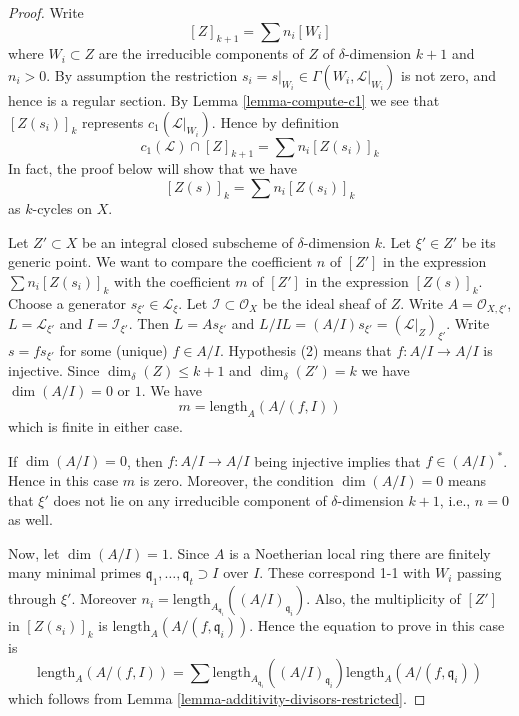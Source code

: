 \begin{proof}
Write
$$
[Z]_{k + 1} = \sum n_i[W_i]
$$
where $W_i \subset Z$ are the irreducible components of
$Z$ of $\delta$-dimension $k + 1$ and $n_i > 0$.
By assumption the restriction
$s_i = s|_{W_i} \in \Gamma(W_i, \mathcal{L}|_{W_i})$ is not
zero, and hence is a regular section. By Lemma \ref{lemma-compute-c1}
we see that $[Z(s_i)]_k$ represents $c_1(\mathcal{L}|_{W_i})$.
Hence by definition
$$
c_1(\mathcal{L}) \cap [Z]_{k + 1} = \sum n_i[Z(s_i)]_k
$$
In fact, the proof below will show that we have
\begin{equation}
\label{equation-equal-as-cycles}
[Z(s)]_k =  \sum n_i[Z(s_i)]_k
\end{equation}
as $k$-cycles on $X$.

\medskip\noindent
Let $Z' \subset X$ be an integral closed subscheme of
$\delta$-dimension $k$. Let $\xi' \in Z'$ be its generic point.
We want to compare the coefficient $n$ of $[Z']$ in the expression
$\sum n_i[Z(s_i)]_k$ with the coefficient $m$ of $[Z']$ in the
expression $[Z(s)]_k$. Choose a generator $s_{\xi'} \in \mathcal{L}_\xi$.
Let $\mathcal{I} \subset \mathcal{O}_X$ be the ideal sheaf of $Z$.
Write $A = \mathcal{O}_{X, \xi'}$, $L = \mathcal{L}_{\xi'}$
and $I = \mathcal{I}_{\xi'}$. Then $L = As_{\xi'}$ and
$L/IL = (A/I)s_{\xi'} = (\mathcal{L}|_Z)_{\xi'}$.
Write $s = f s_{\xi'}$ for some (unique) $f \in A/I$.
Hypothesis (2) means that $f : A/I \to A/I$ is injective.
Since $\dim_\delta(Z) \leq k + 1$ and $\dim_\delta(Z') = k$
we have $\dim(A/I) = 0$ or $1$. We have
$$
m = \text{length}_A(A/(f, I))
$$
which is finite in either case.

\medskip\noindent
If $\dim(A/I) = 0$, then $f : A/I \to A/I$ being injective
implies that $f \in (A/I)^*$. Hence in this case $m$ is zero.
Moreover, the condition $\dim(A/I) = 0$ means that $\xi'$
does not lie on any irreducible component of $\delta$-dimension
$k + 1$, i.e., $n = 0$ as well.

\medskip\noindent
Now, let $\dim(A/I) = 1$.
Since $A$ is a Noetherian local ring there are finitely
many minimal primes $\mathfrak q_1, \ldots, \mathfrak q_t \supset I$
over $I$. These correspond 1-1 with $W_i$ passing through $\xi'$.
Moreover $n_i = \text{length}_{A_{\mathfrak q_i}}((A/I)_{\mathfrak q_i})$.
Also, the multiplicity of $[Z']$ in $[Z(s_i)]_k$ is
$\text{length}_A(A/(f, \mathfrak q_i))$.
Hence the equation to prove in this case is
$$
\text{length}_A(A/(f, I))
=
\sum \text{length}_{A_{\mathfrak q_i}}((A/I)_{\mathfrak q_i})
\text{length}_A(A/(f, \mathfrak q_i))
$$
which follows from Lemma \ref{lemma-additivity-divisors-restricted}.
\end{proof}

